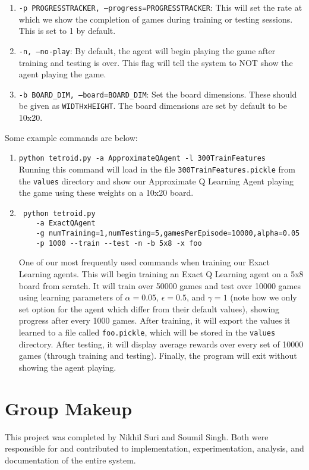 \documentclass[11pt]{article}
\begin{document}
\begin{enumerate}
    \item \texttt{-p PROGRESSTRACKER, --progress=PROGRESSTRACKER}: This will set the rate at which we show the completion of games during training or testing sessions. This is set to 1 by default.
    \item \texttt{-n, --no-play}: By default, the agent will begin playing the game after training and testing is over. This flag will tell the system to NOT show the agent playing the game.
    \item \texttt{-b BOARD\_DIM, --board=BOARD\_DIM}: Set the board dimensions. These should be given as \texttt{WIDTHxHEIGHT}. The board dimensions are set by default to be 10x20.
\end{enumerate}
Some example commands are below:
\begin{enumerate}
    \item \texttt{python tetroid.py -a ApproximateQAgent -l 300TrainFeatures}\\ Running this command will load in the file \texttt{300TrainFeatures.pickle} from the \texttt{values} directory and show our Approximate Q Learning Agent playing the game using these weights on a 10x20 board.
    \item \begin{verbatim} python tetroid.py
    -a ExactQAgent
    -g numTraining=1,numTesting=5,gamesPerEpisode=10000,alpha=0.05
    -p 1000 --train --test -n -b 5x8 -x foo
    \end{verbatim}
    One of our most frequently used commands when training our Exact Learning agents. This will begin training an Exact Q Learning agent on a 5x8 board from scratch. It will train over 50000 games and test over 10000 games using learning parameters of $\alpha=0.05$, $\epsilon=0.5$, and $\gamma=1$ (note how we only set option for the agent which differ from their default values), showing progress after every 1000 games. After training, it will export the values it learned to a file called \texttt{foo.pickle}, which will be stored in the \texttt{values} directory. After testing, it will display average rewards over every set of 10000 games (through training and testing). Finally, the program will exit without showing the agent playing.
\end{enumerate}

\section{Group Makeup}
This project was completed by Nikhil Suri and Soumil Singh. Both were responsible for and contributed to implementation, experimentation, analysis, and documentation of the entire system.



\end{document}
